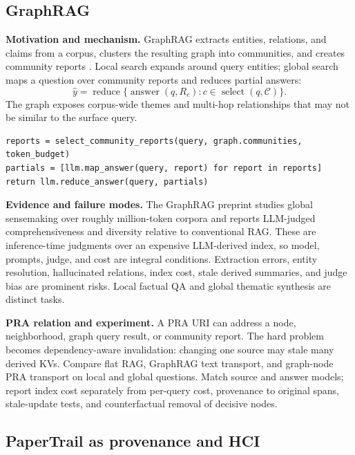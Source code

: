 \subsection{GraphRAG}

\textbf{Motivation and mechanism.} GraphRAG extracts entities, relations, and claims from a
corpus, clusters the resulting graph into communities, and creates community reports
\citep{edge2024graphrag}.  Local search expands around query entities; global search maps a
question over community reports and reduces partial answers:
\begin{equation}
\hat y=\operatorname{reduce}\{\operatorname{answer}(q,R_c):
c\in\operatorname{select}(q,\mathcal C)\}.
\end{equation}
The graph exposes corpus-wide themes and multi-hop relationships that may not be similar to
the surface query.

\begin{lstlisting}[caption={GraphRAG global map-reduce sketch}]
reports = select_community_reports(query, graph.communities, token_budget)
partials = [llm.map_answer(query, report) for report in reports]
return llm.reduce_answer(query, partials)
\end{lstlisting}

\textbf{Evidence and failure modes.} The GraphRAG preprint studies global sensemaking over
roughly million-token corpora and reports LLM-judged comprehensiveness and diversity relative
to conventional RAG.  These are inference-time judgments over an expensive LLM-derived
index, so model, prompts, judge, and cost are integral conditions.  Extraction errors,
entity resolution, hallucinated relations, index cost, stale derived summaries, and judge
bias are prominent risks.  Local factual QA and global thematic synthesis are distinct tasks.

\textbf{PRA relation and experiment.} A PRA URI can address a node, neighborhood, graph
query result, or community report.  The hard problem becomes dependency-aware invalidation:
changing one source may stale many derived KVs.  Compare flat RAG, GraphRAG text transport,
and graph-node PRA transport on local and global questions.  Match source and answer models;
report index cost separately from per-query cost, provenance to original spans, stale-update
tests, and counterfactual removal of decisive nodes.

\subsection{PaperTrail as provenance and HCI}

